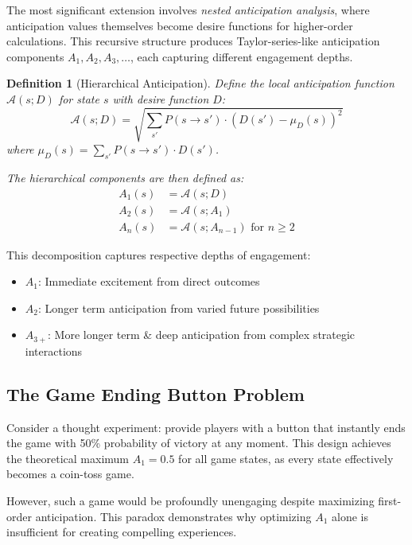 \documentclass{article}
\newtheorem{definition}{Definition}
\begin{document}
The most significant extension involves \emph{nested anticipation analysis}, where anticipation values themselves become desire functions for higher-order calculations. This recursive structure produces Taylor-series-like anticipation components $A_1, A_2, A_3, \ldots$, each capturing different engagement depths.

\begin{definition}[Hierarchical Anticipation]
Define the local anticipation function $\mathcal{A}(s; D)$ for state $s$ with desire function $D$:
\begin{equation}
\mathcal{A}(s; D) = \sqrt{\sum_{s'} P(s \to s') \cdot (D(s') - \mu_D(s))^2}
\end{equation}
where $\mu_D(s) = \sum_{s'} P(s \to s') \cdot D(s')$.

The hierarchical components are then defined as:
\begin{align}
A_1(s) &= \mathcal{A}(s; D) \\
A_2(s) &= \mathcal{A}(s; A_1) \\
A_n(s) &= \mathcal{A}(s; A_{n-1}) \text{ for } n \geq 2
\end{align}
\end{definition}

This decomposition captures respective depths of engagement:
\begin{itemize}
\item $A_1$: Immediate excitement from direct outcomes
\item $A_2$: Longer term anticipation from varied future possibilities
\item $A_{3+}$: More longer term \& deep anticipation from complex strategic interactions
\end{itemize}

\subsection{The Game Ending Button Problem}

Consider a thought experiment: provide players with a button that instantly ends the game with 50\% probability of victory at any moment. This design achieves the theoretical maximum $A_1 = 0.5$ for all game states, as every state effectively becomes a coin-toss game.

However, such a game would be profoundly unengaging despite maximizing first-order anticipation. This paradox demonstrates why optimizing $A_1$ alone is insufficient for creating compelling experiences.
\end{document}
